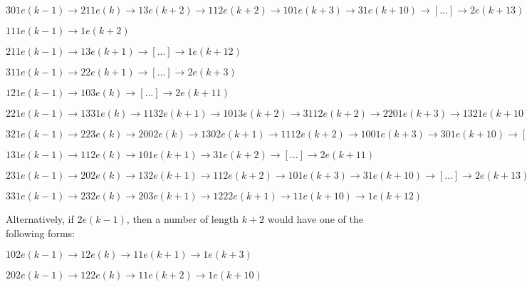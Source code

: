 \documentclass[10pt,a4paper,showpacs,nofootinbib,aps,superscriptaddress,eqsecnum,prd,showkeys,twocolumn,notitlepage]{article}
\begin{document}
$301e(k-1) \rightarrow 211e(k) \rightarrow 13e(k+2) \rightarrow 112e(k+2) \rightarrow 101e(k+3) \rightarrow 31e(k+10) \rightarrow [...] \rightarrow 2e(k+13)$

$111e(k-1) \rightarrow 1e(k+2)$

$211e(k-1) \rightarrow 13e(k+1) \rightarrow [...] \rightarrow 1e(k+12)$

$311e(k-1) \rightarrow 22e(k+1) \rightarrow [...] \rightarrow 2e(k+3)$

$121e(k-1) \rightarrow 103e(k) \rightarrow [...] \rightarrow 2e(k+11)$

$221e(k-1) \rightarrow 1331e(k) \rightarrow 1132e(k+1) \rightarrow 1013e(k+2) \rightarrow 3112e(k+2) \rightarrow 2201e(k+3) \rightarrow 1321e(k+10) \rightarrow 1123e(k+11) \rightarrow 10102e(k+11) \rightarrow 3032e(k+12) \rightarrow 2123e(k+13) \rightarrow 13102e(k+13) \rightarrow 11132e(k+20) \rightarrow 10013e(k+21) \rightarrow 30112e(k+21) \rightarrow 21101e(k+22) \rightarrow 12331e(k+23) \rightarrow 11032e(k+30) \rightarrow 3323e(k+31) \rightarrow 23302e(k+31) \rightarrow 20312e(k+32) \rightarrow 12221e(k+33) \rightarrow 10333e(k+100) \rightarrow 32332e(k+100) \rightarrow 21033e(k+101) \rightarrow 123232e(k+102) \rightarrow 110202e(k+103) \rightarrow 33132e(k+110) \rightarrow 23212e(k+111) \rightarrow 20231e(k+112) \rightarrow 12202e(k+113) \rightarrow 1322e(k+120) \rightarrow 113e(k+122) \rightarrow 1012e(k+122) \rightarrow 311e(k+123) \rightarrow 22e(k+131) \rightarrow 2e(k+133)$

$321e(k-1) \rightarrow 223e(k) \rightarrow 2002e(k) \rightarrow 1302e(k+1) \rightarrow 1112e(k+2) \rightarrow 1001e(k+3) \rightarrow 301e(k+10) \rightarrow [...] \rightarrow 2e(k+30)$

$131e(k-1) \rightarrow 112e(k) \rightarrow 101e(k+1) \rightarrow 31e(k+2) \rightarrow [...] \rightarrow 2e(k+11) $

$231e(k-1) \rightarrow 202e(k) \rightarrow 132e(k+1) \rightarrow 112e(k+2) \rightarrow 101e(k+3) \rightarrow 31e(k+10) \rightarrow [...] \rightarrow 2e(k+13)$

$331e(k-1) \rightarrow 232e(k) \rightarrow 203e(k+1) \rightarrow 1222e(k+1) \rightarrow 11e(k+10) \rightarrow 1e(k+12)$

Alternatively, if $2e(k-1)$, then a number of length $k+2$ would have one of the following forms:

$102e(k-1) \rightarrow 12e(k) \rightarrow 11e(k+1) \rightarrow 1e(k+3)$

$202e(k-1) \rightarrow 122e(k) \rightarrow 11e(k+2) \rightarrow 1e(k+10)$
\end{document}
